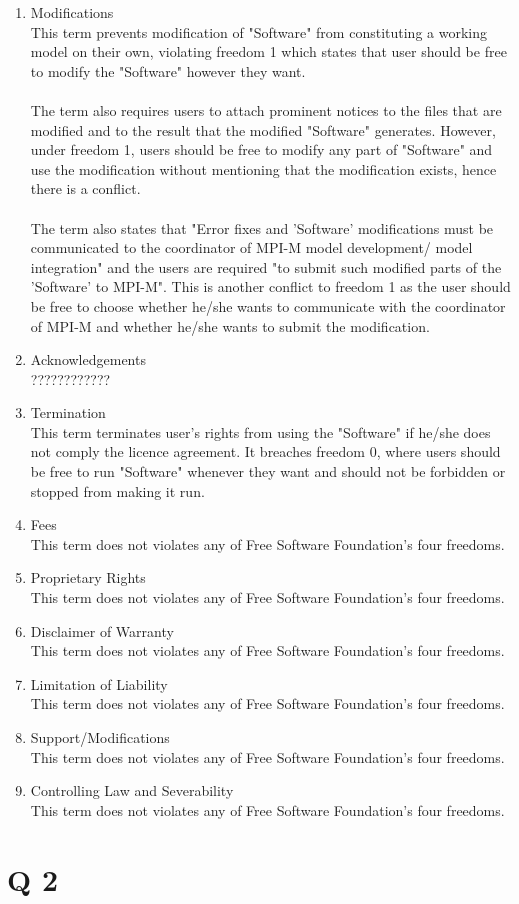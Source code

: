 \documentclass[a4paper]{article}
\begin{document}
\begin{enumerate}
\item Modifications
\\This term prevents modification of "Software" from constituting a working model on their own, violating freedom 1 which states that user should be free to modify the "Software" however they want.
\\
\\The term also requires users to attach prominent notices to the files that are modified and to the result that the modified "Software" generates. However, under freedom 1, users should be free to modify any part of "Software" and use the modification without mentioning that the modification exists, hence there is a conflict. 
\\
\\The term also states that "Error fixes and 'Software' modifications must be communicated to the coordinator of MPI-M model development/ model integration" and the users are required "to submit such modified parts of the 'Software' to MPI-M". This is another conflict to freedom 1 as the user should be free to choose whether he/she wants to communicate with the coordinator of MPI-M and whether he/she wants to submit the modification. 

\item Acknowledgements
\\????????????
\item Termination
\\This term terminates user's rights from using the "Software" if he/she does not comply the licence agreement. It breaches freedom 0, where users should be free to run "Software" whenever they want and should not be forbidden or stopped from making it run.
\item Fees
\\ This term does not violates any of Free Software Foundation's four freedoms.
\item Proprietary Rights
\\ This term does not violates any of Free Software Foundation's four freedoms.
\item Disclaimer of Warranty
\\ This term does not violates any of Free Software Foundation's four freedoms.
\item Limitation of Liability
\\ This term does not violates any of Free Software Foundation's four freedoms.
\item Support/Modifications
\\ This term does not violates any of Free Software Foundation's four freedoms.
\item Controlling Law and Severability
\\ This term does not violates any of Free Software Foundation's four freedoms.
\end{enumerate}


\section*{Q 2}
\end{document}
